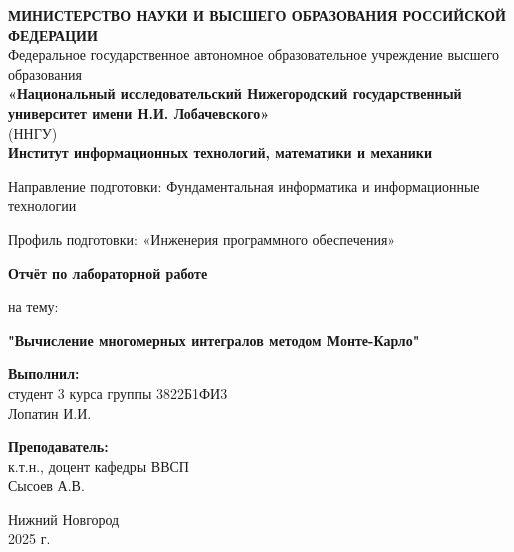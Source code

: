 \documentclass[12pt,a4paper]{extarticle}
\begin{document}
	
	\begin{titlepage}
		\begin{center}
			
			\onehalfspacing
			
			\begin{center}
				\textbf{МИНИСТЕРСТВО НАУКИ И ВЫСШЕГО ОБРАЗОВАНИЯ РОССИЙСКОЙ ФЕДЕРАЦИИ} \\ 			
				\vspace{0.5cm}
				Федеральное государственное автономное образовательное учреждение высшего образования \\ 
				\vspace{0.5cm}
				\textbf{«Национальный исследовательский Нижегородский государственный университет имени Н.И. Лобачевского»} \\
				(ННГУ)\\
				\vspace{0.5cm}
				\textbf{Институт информационных технологий, математики и механики}
			\end{center}
			\vspace{0.5cm}
			\begin{center}
			Направление подготовки: Фундаментальная информатика и информационные технологии
			
			
			Профиль подготовки: «Инженерия программного обеспечения»
			\end{center}
			\vspace{2.5cm}
			\begin{center}
				\textbf{Отчёт по лабораторной работе}

				на тему: 
				
				\textbf{"Вычисление многомерных интегралов методом Монте-Карло"}
			\end{center}
			
			\vspace{2.5cm}
			
			\begin{flushright}
				\textbf{Выполнил:} \\
				студент 3 курса группы 3822Б1ФИ3 \\
				Лопатин И.И. \\
				
				\vspace{1cm}
				
			\noindent\textbf{Преподаватель:} \\
			к.т.н., доцент кафедры ВВСП \\
			{Сысоев А.В.}
			\end{flushright}
			
			\vspace{2em}
			
			\vfill
			
			\begin{center}
				Нижний Новгород \\
				2025 г.
			\end{center}
			
		\end{center}
	\end{titlepage}
	
\end{document}
